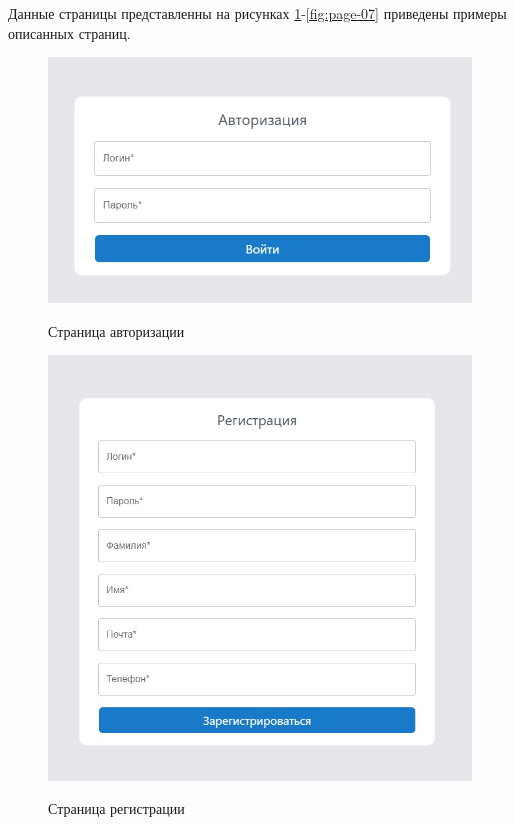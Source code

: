 Данные страницы представленны на рисунках \ref{fig:page-01}-\ref{fig:page-07} приведены примеры описанных страниц.

\begin{figure}[H]
	\begin{center}
		{\includegraphics[scale = 0.8]{img/pages/page-01.jpg}}
		\caption{Страница авторизации}
		\label{fig:page-01}
	\end{center}
\end{figure}

\begin{figure}[H]
	\begin{center}
		{\includegraphics[scale = 0.7]{img/pages/page-02.jpg}}
		\caption{Страница регистрации}
		\label{fig:page-02}
	\end{center}
\end{figure}

